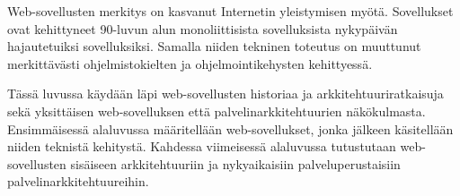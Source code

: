 Web-sovellusten merkitys on kasvanut Internetin yleistymisen myötä. Sovellukset ovat kehittyneet 90-luvun alun monoliittisista sovelluksista nykypäivän hajautetuiksi sovelluksiksi. Samalla niiden tekninen toteutus on muuttunut merkittävästi ohjelmistokielten ja ohjelmointikehysten kehittyessä.

Tässä luvussa käydään läpi web-sovellusten historiaa ja arkkitehtuuriratkaisuja sekä yksittäisen web-sovelluksen että palvelinarkkitehtuurien näkökulmasta. Ensimmäisessä alaluvussa määritellään web-sovellukset, jonka jälkeen käsitellään niiden teknistä kehitystä. Kahdessa viimeisessä alaluvussa tutustutaan web-sovellusten si\-säi\-seen arkkitehtuuriin ja nykyaikaisiin palveluperustaisiin palvelinarkkitehtuureihin.